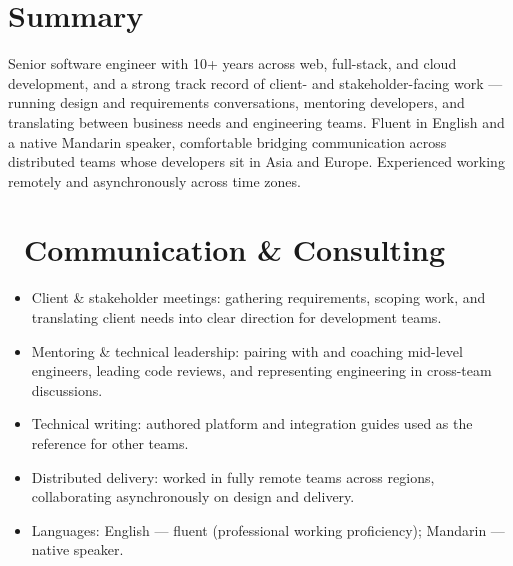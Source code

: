 \documentclass{resume}
\begin{document}


  \vspace{2em}

\section*{Summary}
Senior software engineer with 10+ years across web, full-stack, and cloud development, and a strong track record of client- and stakeholder-facing work — running design and requirements conversations, mentoring developers, and translating between business needs and engineering teams. Fluent in English and a native Mandarin speaker, comfortable bridging communication across distributed teams whose developers sit in Asia and Europe. Experienced working remotely and asynchronously across time zones.

\section{\faCogs\ Communication \& Consulting}
\begin{itemize}[parsep=0.5ex]
  \item Client \& stakeholder meetings: gathering requirements, scoping work, and translating client needs into clear direction for development teams.
  \item Mentoring \& technical leadership: pairing with and coaching mid-level engineers, leading code reviews, and representing engineering in cross-team discussions.
  \item Technical writing: authored platform and integration guides used as the reference for other teams.
  \item Distributed delivery: worked in fully remote teams across regions, collaborating asynchronously on design and delivery.
  \item Languages: English — fluent (professional working proficiency); Mandarin — native speaker.
\end{itemize}
\end{document}
